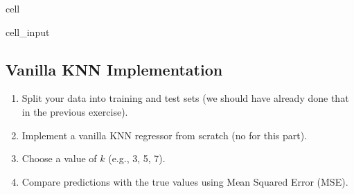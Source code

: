 \documentclass[letterpaper,10pt,english]{jupyterBook}
\begin{document}
\begin{sphinxuseclass}{cell}\begin{sphinxVerbatimInput}

\begin{sphinxuseclass}{cell_input}
\begin{sphinxVerbatim}[commandchars=\\\{\}]
 

  
  
  

  
  
  
  
\end{sphinxVerbatim}

\end{sphinxuseclass}\end{sphinxVerbatimInput}

\end{sphinxuseclass}

\subsection{Vanilla KNN Implementation}
\label{\detokenize{03:vanilla-knn-implementation}}\begin{enumerate}
%
\item {} 
\sphinxAtStartPar
Split your data into training and test sets (we should have already done that in the previous exercise).

\item {} 
\sphinxAtStartPar
Implement a vanilla KNN regressor from scratch (no  for this part).

\item {} 
\sphinxAtStartPar
Choose a value of \(k\) (e.g., 3, 5, 7).

\item {} 
\sphinxAtStartPar
Compare predictions with the true values using Mean Squared Error (MSE).

\end{enumerate}
\end{document}
